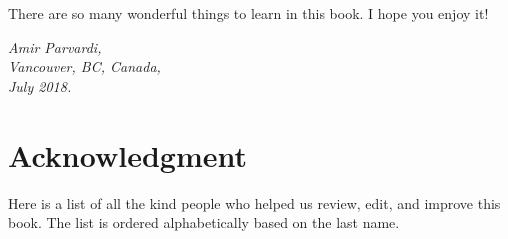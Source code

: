 \documentclass[leqno,12pt]{book}
\begin{document}
\vspace{0.3cm}

There are so many wonderful things to learn in this book. I hope you enjoy it!
\begin{flushright}
	\sl Amir Parvardi,\\
	Vancouver, BC, Canada,\\
	July 2018.
\end{flushright}

\newpage

\section*{Acknowledgment}

Here is a list of all the kind people who helped us review, edit, and improve this book. The list is ordered alphabetically based on the last name.
\end{document}
